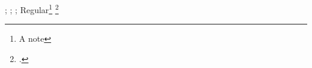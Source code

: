 \documentclass{article}
\begin{document}
\tableofcontents
\cite{ada1843,smith2020a,smith2020b}
\parencite[see][p. 12]{corp2021}
\textcite{web2022}
\autocite{talk2023}
\cite{multi2025}
\cite{ada1843,ada1844}
\cites[cf.][p. 8]{ada1843}[p. 2]{smith2020a}
\citeauthor{smith2020a}; ; \citeyear{talk2023}
\citet{ada1843}; \citep{web2022}
Regular\footnote{A note}
\footcite{corp2021}
\printbibliography[title={Main sources},keyword=core]
\printbibliography[heading=none,nottype=article]
\begin{refsection}
\cite{ada1843}
\printbibliography
\end{refsection}
\begin{refsegment}
\cite{ada1844}
\printbibliography[segment=1,heading=subbibliography]
\end{refsegment}
\printbibliography[section=1,heading=none]
\printbibliography[type=online,notkeyword=core,heading=none]
\printbibliography[heading=bibintoc,title={Indexed Sources}]
\end{document}
